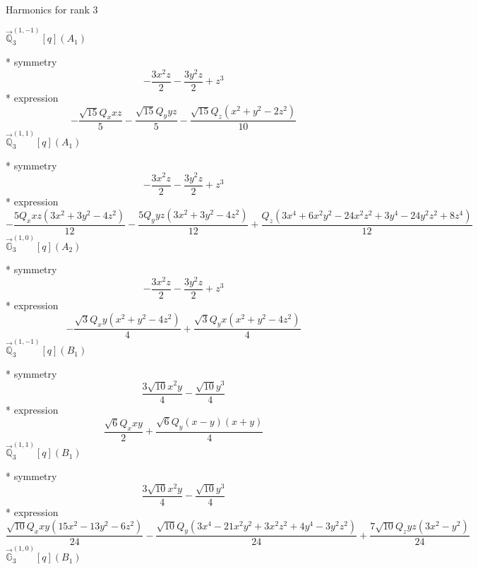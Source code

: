 \documentclass[fleqn,8pt]{jsarticle}
\begin{document}
\noindent * Harmonics for rank 3

\noindent\quad $\vec{\mathbb{Q}}_{3}^{(1,-1)}[q](A_{1})$

\noindent\quad ** symmetry
\begin{dmath*}
- \frac{3 x^{2} z}{2} - \frac{3 y^{2} z}{2} + z^{3}
\end{dmath*}
\noindent\quad ** expression
\begin{dmath*}
- \frac{\sqrt{15} Q_{x} x z}{5} - \frac{\sqrt{15} Q_{y} y z}{5} - \frac{\sqrt{15} Q_{z} \left(x^{2} + y^{2} - 2 z^{2}\right)}{10}
\end{dmath*}
\noindent\quad $\vec{\mathbb{Q}}_{3}^{(1,1)}[q](A_{1})$

\noindent\quad ** symmetry
\begin{dmath*}
- \frac{3 x^{2} z}{2} - \frac{3 y^{2} z}{2} + z^{3}
\end{dmath*}
\noindent\quad ** expression
\begin{dmath*}
- \frac{5 Q_{x} x z \left(3 x^{2} + 3 y^{2} - 4 z^{2}\right)}{12} - \frac{5 Q_{y} y z \left(3 x^{2} + 3 y^{2} - 4 z^{2}\right)}{12} + \frac{Q_{z} \left(3 x^{4} + 6 x^{2} y^{2} - 24 x^{2} z^{2} + 3 y^{4} - 24 y^{2} z^{2} + 8 z^{4}\right)}{12}
\end{dmath*}
\noindent\quad $\vec{\mathbb{G}}_{3}^{(1,0)}[q](A_{2})$

\noindent\quad ** symmetry
\begin{dmath*}
- \frac{3 x^{2} z}{2} - \frac{3 y^{2} z}{2} + z^{3}
\end{dmath*}
\noindent\quad ** expression
\begin{dmath*}
- \frac{\sqrt{3} Q_{x} y \left(x^{2} + y^{2} - 4 z^{2}\right)}{4} + \frac{\sqrt{3} Q_{y} x \left(x^{2} + y^{2} - 4 z^{2}\right)}{4}
\end{dmath*}
\noindent\quad $\vec{\mathbb{Q}}_{3}^{(1,-1)}[q](B_{1})$

\noindent\quad ** symmetry
\begin{dmath*}
\frac{3 \sqrt{10} x^{2} y}{4} - \frac{\sqrt{10} y^{3}}{4}
\end{dmath*}
\noindent\quad ** expression
\begin{dmath*}
\frac{\sqrt{6} Q_{x} x y}{2} + \frac{\sqrt{6} Q_{y} \left(x - y\right) \left(x + y\right)}{4}
\end{dmath*}
\noindent\quad $\vec{\mathbb{Q}}_{3}^{(1,1)}[q](B_{1})$

\noindent\quad ** symmetry
\begin{dmath*}
\frac{3 \sqrt{10} x^{2} y}{4} - \frac{\sqrt{10} y^{3}}{4}
\end{dmath*}
\noindent\quad ** expression
\begin{dmath*}
\frac{\sqrt{10} Q_{x} x y \left(15 x^{2} - 13 y^{2} - 6 z^{2}\right)}{24} - \frac{\sqrt{10} Q_{y} \left(3 x^{4} - 21 x^{2} y^{2} + 3 x^{2} z^{2} + 4 y^{4} - 3 y^{2} z^{2}\right)}{24} + \frac{7 \sqrt{10} Q_{z} y z \left(3 x^{2} - y^{2}\right)}{24}
\end{dmath*}
\noindent\quad $\vec{\mathbb{G}}_{3}^{(1,0)}[q](B_{1})$
\end{document}
